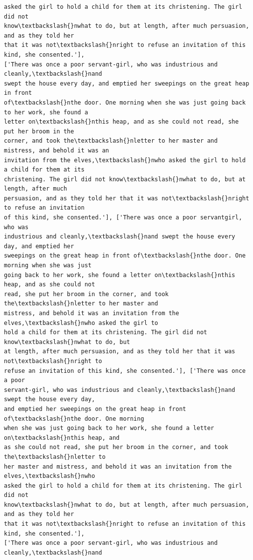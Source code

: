 \documentclass[11pt]{article}
\begin{document}
\begin{Verbatim}[commandchars=\\\{\}]
asked the girl to hold a child for them at its christening. The girl did not
know\textbackslash{}nwhat to do, but at length, after much persuasion, and as they told her
that it was not\textbackslash{}nright to refuse an invitation of this kind, she consented.'],
['There was once a poor servant-girl, who was industrious and cleanly,\textbackslash{}nand
swept the house every day, and emptied her sweepings on the great heap in front
of\textbackslash{}nthe door. One morning when she was just going back to her work, she found a
letter on\textbackslash{}nthis heap, and as she could not read, she put her broom in the
corner, and took the\textbackslash{}nletter to her master and mistress, and behold it was an
invitation from the elves,\textbackslash{}nwho asked the girl to hold a child for them at its
christening. The girl did not know\textbackslash{}nwhat to do, but at length, after much
persuasion, and as they told her that it was not\textbackslash{}nright to refuse an invitation
of this kind, she consented.'], ['There was once a poor servantgirl, who was
industrious and cleanly,\textbackslash{}nand swept the house every day, and emptied her
sweepings on the great heap in front of\textbackslash{}nthe door. One morning when she was just
going back to her work, she found a letter on\textbackslash{}nthis heap, and as she could not
read, she put her broom in the corner, and took the\textbackslash{}nletter to her master and
mistress, and behold it was an invitation from the elves,\textbackslash{}nwho asked the girl to
hold a child for them at its christening. The girl did not know\textbackslash{}nwhat to do, but
at length, after much persuasion, and as they told her that it was not\textbackslash{}nright to
refuse an invitation of this kind, she consented.'], ['There was once a poor
servant-girl, who was industrious and cleanly,\textbackslash{}nand swept the house every day,
and emptied her sweepings on the great heap in front of\textbackslash{}nthe door. One morning
when she was just going back to her work, she found a letter on\textbackslash{}nthis heap, and
as she could not read, she put her broom in the corner, and took the\textbackslash{}nletter to
her master and mistress, and behold it was an invitation from the elves,\textbackslash{}nwho
asked the girl to hold a child for them at its christening. The girl did not
know\textbackslash{}nwhat to do, but at length, after much persuasion, and as they told her
that it was not\textbackslash{}nright to refuse an invitation of this kind, she consented.'],
['There was once a poor servant-girl, who was industrious and cleanly,\textbackslash{}nand

\end{Verbatim}
\end{document}
